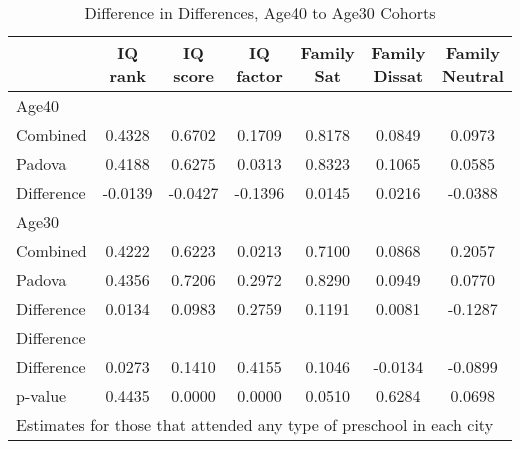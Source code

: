 \begin{table}[htbp]\centering
\caption{Difference in Differences, Age40 to Age30 Cohorts}
\begin{tabular}{l*{6}{c}}
\hline\hline
            &     IQ rank&    IQ score&   IQ factor&  Family Sat&Family Dissat&Family Neutral\\
\hline
Age40       &            &            &            &            &            &            \\
Combined    &      0.4328&      0.6702&      0.1709&      0.8178&      0.0849&      0.0973\\
Padova      &      0.4188&      0.6275&      0.0313&      0.8323&      0.1065&      0.0585\\
Difference  &     -0.0139&     -0.0427&     -0.1396&      0.0145&      0.0216&     -0.0388\\
\hline
Age30       &            &            &            &            &            &            \\
Combined    &      0.4222&      0.6223&      0.0213&      0.7100&      0.0868&      0.2057\\
Padova      &      0.4356&      0.7206&      0.2972&      0.8290&      0.0949&      0.0770\\
Difference  &      0.0134&      0.0983&      0.2759&      0.1191&      0.0081&     -0.1287\\
\hline
Difference  &            &            &            &            &            &            \\
Difference  &      0.0273&      0.1410&      0.4155&      0.1046&     -0.0134&     -0.0899\\
p-value     &      0.4435&      0.0000&      0.0000&      0.0510&      0.6284&      0.0698\\
\hline\hline
\multicolumn{7}{l}{\footnotesize Estimates for those that attended any type of preschool in each city}\\
\end{tabular}
\end{table}
